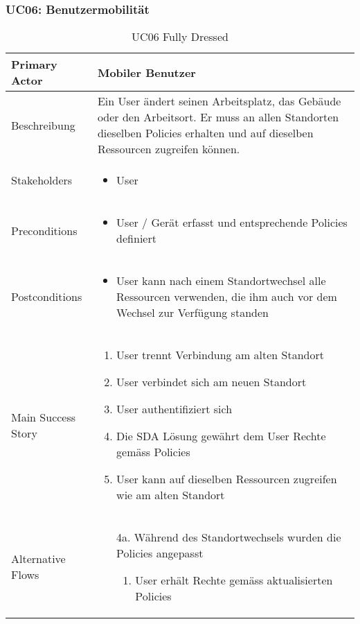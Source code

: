 \subsubsection{UC06: Benutzermobilität}
\begin{table}[H]
	\centering
	\begin{tabularx}{\textwidth}{l | X}
		Primary Actor   & Mobiler Benutzer        \\
		\hline
		Beschreibung   & Ein User ändert seinen Arbeitsplatz, das Gebäude oder den Arbeitsort. Er muss an allen Standorten dieselben Policies erhalten und auf dieselben Ressourcen zugreifen können.  \\ 
		\hline
		Stakeholders       & 
		\begin{itemize}
			\item User
		\end{itemize} \\ 
		Preconditions      &
		\begin{itemize}	
			\item User / Gerät erfasst und entsprechende Policies definiert
		\end{itemize}  \\
		\hline
		Postconditions     & 
		\begin{itemize}	
			\item User kann nach einem Standortwechsel alle Ressourcen verwenden, die ihm auch vor dem Wechsel zur Verfügung standen
		\end{itemize}  \\
		\hline
		Main Success Story & 
		\begin{enumerate}
			\item User trennt Verbindung am alten Standort
			\item User verbindet sich am neuen Standort
			\item User authentifiziert sich
			\item Die SDA Lösung gewährt dem User Rechte gemäss Policies
			\item User kann auf dieselben Ressourcen zugreifen wie am alten Standort
		\end{enumerate}
		\\
		\hline
		Alternative Flows  & 
		\begin{itemize}
			\item[4a.]  Während des Standortwechsels wurden die Policies angepasst
			\begin{enumerate}
				\item User erhält Rechte gemäss aktualisierten Policies
			\end{enumerate}
		\end{itemize}
	\end{tabularx}
	\caption{UC06 Fully Dressed}
	\label{tab:UC06}
\end{table}

